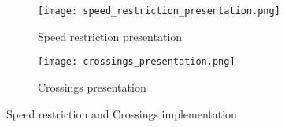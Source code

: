 \begin{figure}[h!tbp]
	\centering
	\begin{subfigure}{0.6\textwidth}
		\texttt{[image: speed\_restriction\_presentation.png]}
		\caption[Speed restriction presentation]{Speed restriction presentation}
		\label{fig:speed_restriction_presentation}
	\end{subfigure}
	\begin{subfigure}{0.25\textwidth}
		\texttt{[image: crossings\_presentation.png]}
		\caption[Crossings presentation]{Crossings presentation}
		\label{fig:crossings_presentation}
	\end{subfigure}
	\caption[Speed restriction and Crossings implementation]{Speed restriction and Crossings implementation}
	\label{fig:crossings_and_speed_restriction_implementation}
\end{figure}

